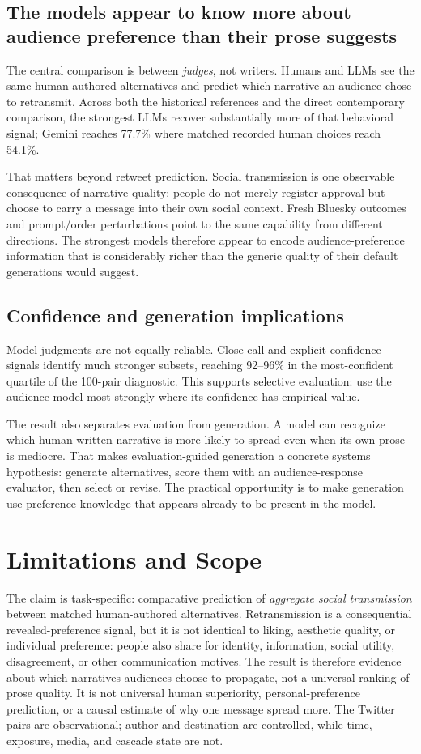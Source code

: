 \documentclass[10pt,twocolumn]{article}
\begin{document}
\subsection{The models appear to know more about audience preference than their prose suggests}
The central comparison is between \emph{judges}, not writers. Humans and LLMs see the same human-authored alternatives and predict which narrative an audience chose to retransmit. Across both the historical references and the direct contemporary comparison, the strongest LLMs recover substantially more of that behavioral signal; Gemini reaches 77.7\% where matched recorded human choices reach 54.1\%.

That matters beyond retweet prediction. Social transmission is one observable consequence of narrative quality: people do not merely register approval but choose to carry a message into their own social context. Fresh Bluesky outcomes and prompt/order perturbations point to the same capability from different directions. The strongest models therefore appear to encode audience-preference information that is considerably richer than the generic quality of their default generations would suggest.

\subsection{Confidence and generation implications}
Model judgments are not equally reliable. Close-call and explicit-confidence signals identify much stronger subsets, reaching 92--96\% in the most-confident quartile of the 100-pair diagnostic. This supports selective evaluation: use the audience model most strongly where its confidence has empirical value.

The result also separates evaluation from generation. A model can recognize which human-written narrative is more likely to spread even when its own prose is mediocre. That makes evaluation-guided generation a concrete systems hypothesis: generate alternatives, score them with an audience-response evaluator, then select or revise. The practical opportunity is to make generation use preference knowledge that appears already to be present in the model.

\section{Limitations and Scope}
The claim is task-specific: comparative prediction of \emph{aggregate social transmission} between matched human-authored alternatives. Retransmission is a consequential revealed-preference signal, but it is not identical to liking, aesthetic quality, or individual preference: people also share for identity, information, social utility, disagreement, or other communication motives. The result is therefore evidence about which narratives audiences choose to propagate, not a universal ranking of prose quality. It is not universal human superiority, personal-preference prediction, or a causal estimate of why one message spread more. The Twitter pairs are observational; author and destination are controlled, while time, exposure, media, and cascade state are not.
\end{document}
